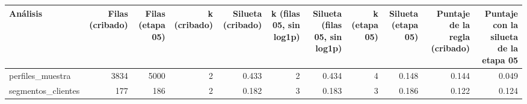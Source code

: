 \begin{tabular}{lrrrrrrrrrr}
\toprule
Análisis & Filas (cribado) & Filas (etapa 05) & k (cribado) & Silueta (cribado) & k (filas 05, sin log1p) & Silueta (filas 05, sin log1p) & k (etapa 05) & Silueta (etapa 05) & Puntaje de la regla (cribado) & Puntaje con la silueta de la etapa 05 \\
\midrule
perfiles\_muestra & 3834 & 5000 & 2 & 0.433 & 2 & 0.434 & 4 & 0.148 & 0.144 & 0.049 \\
segmentos\_clientes & 177 & 186 & 2 & 0.182 & 3 & 0.183 & 3 & 0.186 & 0.122 & 0.124 \\
\bottomrule
\end{tabular}
